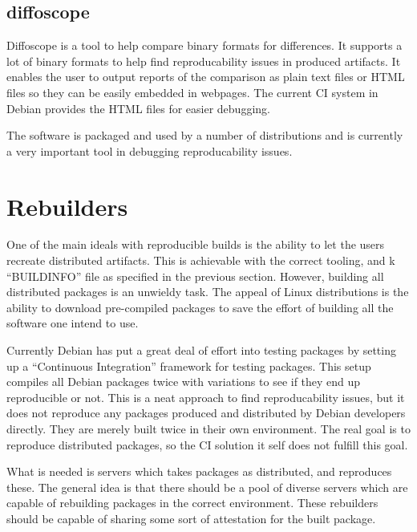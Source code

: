 \documentclass[../Main/thesis.tex]{subfiles}
\begin{document}
\subsection*{diffoscope}
Diffoscope is a tool to help compare binary formats for differences. It supports
a lot of binary formats to help find reproducability issues in produced
artifacts. It enables the user to output reports of the comparison as plain text
files or HTML files so they can be easily embedded in webpages. The current CI
system in Debian provides the HTML files for easier debugging.

The software is packaged and used by a number of distributions and is currently
a very important tool in debugging reproducability issues.


\section{Rebuilders}\label{sec:rebuilders} 
One of the main ideals with reproducible builds is the ability to let the users
recreate distributed artifacts. This is achievable with the correct tooling, and
k ``BUILDINFO'' file as specified in the previous section. However, building all
distributed packages is an unwieldy task. The appeal of Linux distributions is
the ability to download pre-compiled packages to save the effort of building all
the software one intend to use.


Currently Debian has put a great deal of effort into testing packages by setting
up a ``Continuous Integration'' framework for testing packages. This setup
compiles all Debian packages twice with variations to see if they end up
reproducible or not. This is a neat approach to find reproducability issues, but
it does not reproduce any packages produced and distributed by Debian developers
directly. They are merely built twice in their own environment. The real goal is
to reproduce distributed packages, so the CI solution it self does not fulfill
this goal.

What is needed is servers which takes packages as distributed, and reproduces
these. The general idea is that there should be a pool of diverse servers which
are capable of rebuilding packages in the correct environment. These rebuilders
should be capable of sharing some sort of attestation for the built package.

\end{document}
